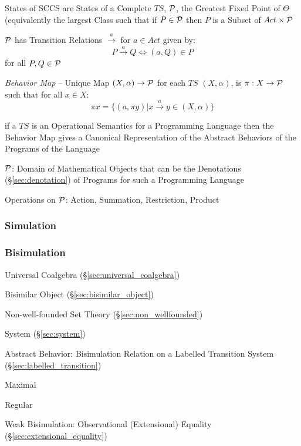 States of SCCS are States of a Complete $TS$, $\mathcal{P}$, the
Greatest Fixed Point of $\Theta$ (equivalently the largest Class such
that if $P \in \mathcal{P}$ then $P$ is a Subset of $Act \times
\mathcal{P}$

$\mathcal{P}$ has Transition Relations $\xrightarrow{a}$ for $a \in Act$
given by:
\[
  P \xrightarrow{a} Q \Leftrightarrow (a,Q) \in P
\]
for all $P,Q \in \mathcal{P}$

\emph{Behavior Map} -- Unique Map $(X,\alpha) \rightarrow \mathcal{P}$
for each $TS$ $(X,\alpha)$, is $\pi : X \rightarrow \mathcal{P}$ such
that for all $x \in X$:
\[
  \pi x = \{(a,\pi y) | x \xrightarrow{a} y \in (X,\alpha)\}
\]

if a $TS$ is an Operational Semantics for a Programming Language then
the Behavior Map gives a Canonical Representation of the Abstract
Behaviors of the Programs of the Language

$\mathcal{P}$: Domain of Mathematical Objects that can be the
Denotations (\S\ref{sec:denotation}) of Programs for such a
Programming Language

Operations on $\mathcal{P}$: Action, Summation, Restriction, Product



\subsubsection{Simulation} \label{sec:simulation}

\subsubsection{Bisimulation} \label{sec:bisimulation}

Universal Coalgebra (\S\ref{sec:universal_coalgebra})

Bisimilar Object (\S\ref{sec:bisimilar_object})

Non-well-founded Set Theory (\S\ref{sec:non_wellfounded})

System (\S\ref{sec:system})

Abstract Behavior: Bisimulation Relation on a Labelled Transition
System (\S\ref{sec:labelled_transition}) \cite{aczel88}

Maximal

Regular

Weak Bisimulation: Observational (Extensional) Equality
(\S\ref{sec:extensional_equality})



